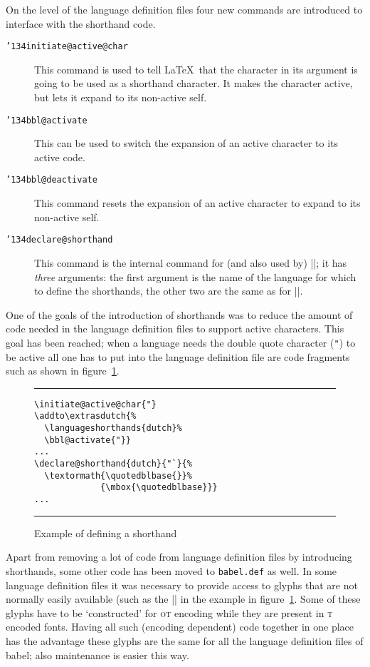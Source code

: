 \documentclass{ltugboat}
\newcommand\figrule{\kern3pt\hrule\kern3pt}
\newcommand*{\file}[1]{\texttt{#1}}
\newcommand*\babel{\textsf{babel}}
\newcommand*\bs{\char'134}
\let\osn\oldstylenums
\begin{document}
On the level of the language definition files four new commands are
introduced to interface with the shorthand code.
\begin{description}
\item[\texttt{\bs initiate@active@char}] This command is used to tell
  \LaTeX\ that the character in its argument is going to be used as a
  shorthand character. It makes the character active, but lets it
  expand to its non-active self.
\item[\texttt{\bs bbl@activate}] This can be used to switch
  the expansion of an active character to its active code.
\item[\texttt{\bs bbl@deactivate}] This command resets the expansion
  of an active character to expand to its non-active self.
\item[\texttt{\bs declare@shorthand}] This command is the internal
  command for (and also used by) ||; it has
  \emph{three} arguments: the first argument is the name of the
  language for which to define the shorthands, the other two are the
  same as for ||.
\end{description}

One of the goals of the introduction of shorthands was to reduce the
amount of code needed in the language definition files to support
active characters. This goal has been reached; when a language needs
the double quote character (\texttt{"}) to be active all one has to
put into the language definition file are code fragments such as shown
in figure~\ref{fig:dq}.

\begin{figure}[ht]
  \figrule
\begin{verbatim}
\initiate@active@char{"}
\addto\extrasdutch{%
  \languageshorthands{dutch}%
  \bbl@activate{"}}
...
\declare@shorthand{dutch}{"`}{%
  \textormath{\quotedblbase{}}%
             {\mbox{\quotedblbase}}}
...
\end{verbatim}
  \figrule
  \caption{Example of defining a shorthand}\label{fig:dq}
\end{figure}

Apart from removing a lot of code from language definition files by
introducing shorthands, some other code has been moved to
\file{babel.def} as well. In some language definition files it was
necessary to provide access to glyphs that are not normally easily
available (such as the |\quotedblbase| in the example in
figure~\ref{fig:dq}. Some of these glyphs have to be `constructed' for
\textsc{ot}\osn{1} encoding while they are present in
\textsc{t}\osn{1} encoded fonts. Having all such (encoding dependent)
code together in one place has the advantage these glyphs are the same
for all the language definition files of \babel; also maintenance is
easier this way.
\end{document}
